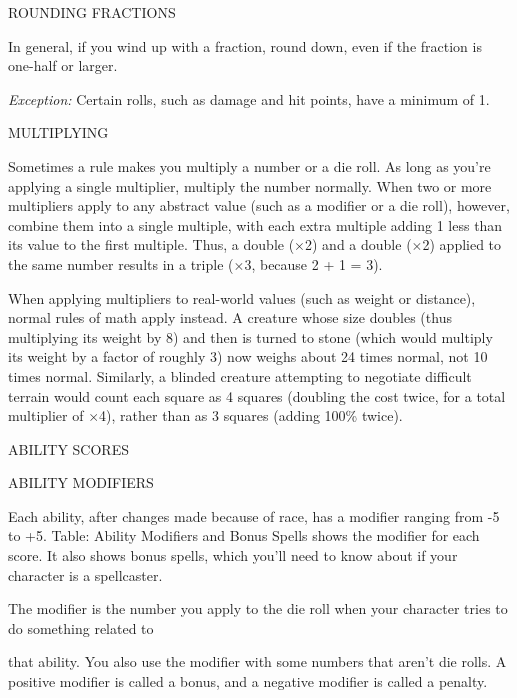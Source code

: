 \vspace{12pt}
ROUNDING FRACTIONS

In general, if you wind up with a fraction, round down, even if the fraction is 
one-half or larger.

\textit{Exception: }Certain rolls, such as damage and hit points, have a minimum 
of 1.

\vspace{12pt}
MULTIPLYING

Sometimes a rule makes you multiply a number or a die roll. As long as you're applying 
a single multiplier, multiply the number normally. When two or more multipliers 
apply to any abstract value (such as a modifier or a die roll), however, combine 
them into a single multiple, with each extra multiple adding 1 less than its value 
to the first multiple. Thus, a double (\ensuremath{\times}2) and a double (\ensuremath{\times}2) 
applied to the same number results in a triple (\ensuremath{\times}3, because 2 
+ 1 = 3).

\vspace{12pt}
When applying multipliers to real-world values (such as weight or distance), normal 
rules of math apply instead. A creature whose size doubles (thus multiplying its 
weight by 8) and then is turned to stone (which would multiply its weight by a 
factor of roughly 3) now weighs about 24 times normal, not 10 times normal. Similarly, 
a blinded creature attempting to negotiate difficult terrain would count each square 
as 4 squares (doubling the cost twice, for a total multiplier of \ensuremath{\times}4), 
rather than as 3 squares (adding 100\% twice). 

\vspace{12pt}
{\LARGE{}ABILITY SCORES}

\vspace{12pt}
ABILITY MODIFIERS

Each ability, after changes made because of race, has a modifier ranging from -5 
to +5. Table: Ability Modifiers and Bonus Spells shows the modifier for each score. 
It also shows bonus spells, which you'll need to know about if your character is 
a spellcaster.

The modifier is the number you apply to the die roll when your character tries 
to do something related to

that ability. You also use the modifier with some numbers that aren't die rolls. 
A positive modifier is called a bonus, and a negative modifier is called a penalty.

